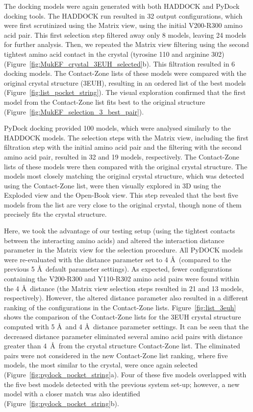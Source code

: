 \documentclass{bmcart}
\def\OpBook {Open-Book view\xspace}
\def\ExpView {Exploded view\xspace}
\def\MatView {Matrix view\xspace}
\def\CoZoList{Contact-Zone list\xspace}
\def\CoZoLists{Contact-Zone lists\xspace}
\begin{document}
The docking models were again generated with both HADDOCK and PyDock docking tools.
The HADDOCK run resulted in 32 output configurations, which were first scrutinized using the \MatView, using the initial V200-R300 amino acid pair. 
This first selection step filtered away only 8 models, leaving 24 models for further analysis. 
Then, we repeated the \MatView filtering using the second tightest amino acid contact in the crystal (tyrosine 110 and arginine 302) (Figure~\ref{fig:MukEF_crystal_3EUH_selected}b). 
This filtration resulted in 6 docking models. 
The \CoZoLists of these models were compared with the original crystal structure (3EUH), resulting in an ordered list of the best models (Figure~\ref{fig:list_pocket_string}).
The visual exploration confirmed that the first model from the \CoZoList fits best to the original structure (Figure~\ref{fig:MukEF_selection_3_best_pair}). 

PyDock docking provided 100 models, which were analysed similarly to the HADDOCK models. 
The selection steps with the \MatView, including the first filtration step with the initial amino acid pair and the filtering with the second amino acid pair, resulted in 32 and 19 models, respectively. 
The \CoZoLists of these models were then compared with the original crystal structure.
The models most closely matching the original crystal structure, which was detected using the \CoZoList, were then visually explored in 3D using the \ExpView and the \OpBook.
This step revealed that the best five models from the list are very close to the original crystal, though none of them precisely fits the crystal structure.

Here, we took the advantage of our testing setup (using the tightest contacts between the interacting amino acids) and altered the interaction distance parameter in the \MatView for the selection procedure. 
All PyDOCK models were re-evaluated with the distance parameter set to 4 \AA~(compared to the previous 5 \AA~default parameter settings). 
As expected, fewer configurations containing the V200-R300 and Y110-R302 amino acid pairs were found within the 4 \AA~distance (the \MatView selection steps resulted in 21 and 13 models, respectively).
However, the altered distance parameter also resulted in a different ranking of the configurations in the \CoZoLists.
Figure~\ref{fig:list_3euh} shows the comparison of the \CoZoLists for the 3EUH crystal structure computed with 5 \AA~and 4 \AA~distance parameter settings.
It can be seen that the decreased distance parameter eliminated several amino acid pairs with distance greater than 4~\AA~from the crystal structure \CoZoList.
The eliminated pairs were not considered in the new \CoZoList ranking, where five models, the most similar to the crystal, were once again selected (Figure~\ref{fig:pydock_pocket_string}a). 
Four of these five models overlapped with the five best models detected with the previous system set-up; however, a new model with a closer match was also identified (Figure~\ref{fig:pydock_pocket_string}b).
\end{document}
